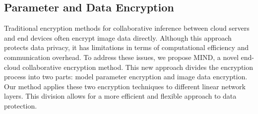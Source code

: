 \documentclass[conference]{IEEEtran}
\begin{document}



\subsection{Parameter and Data Encryption}
Traditional encryption methods for collaborative inference between cloud servers and end devices often encrypt image data directly. Although this approach protects data privacy, it has limitations in terms of computational efficiency and communication overhead. To address these issues, we propose MIND, a novel end-cloud collaborative encryption method. This new approach divides the encryption process into two parts: model parameter encryption and image data encryption. Our method applies these two encryption techniques to different linear network layers. This division allows for a more efficient and flexible approach to data protection.
\end{document}
